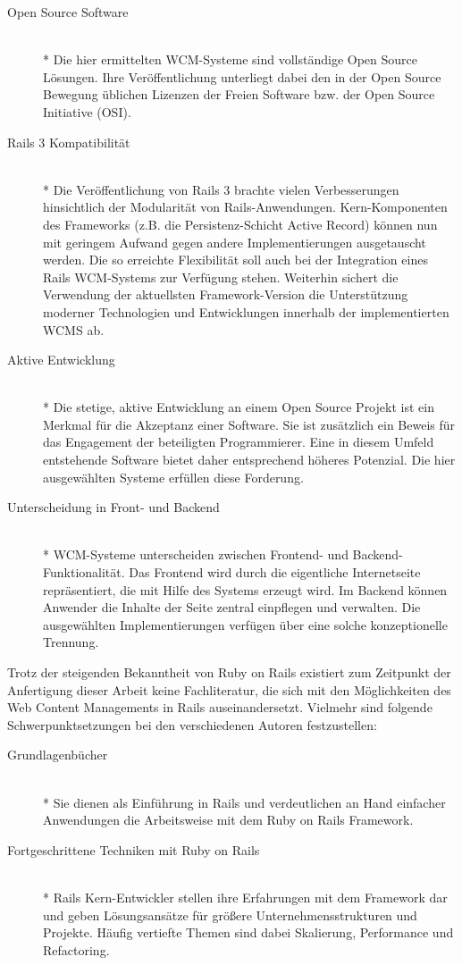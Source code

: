 \begin{description}
\item[Open Source Software]\mbox{~}\\*
Die hier ermittelten WCM-Systeme sind vollständige Open Source Lösungen. Ihre Veröffentlichung unterliegt dabei den in der Open Source Bewegung üblichen Lizenzen der Freien Software bzw. der Open Source Initiative (OSI).
\item[Rails 3 Kompatibilität]\mbox{~}\\*
Die Veröffentlichung von Rails 3 brachte vielen Verbesserungen hinsichtlich der Modularität von Rails-Anwendungen. Kern-Komponenten des Frameworks (z.B. die Persistenz-Schicht Active Record) können nun mit geringem Aufwand gegen andere Implementierungen ausgetauscht werden. Die so erreichte Flexibilität soll auch bei der Integration eines Rails WCM-Systems zur Verfügung stehen.	Weiterhin sichert die Verwendung der aktuellsten Framework-Version die 	Unterstützung moderner Technologien und Entwicklungen innerhalb der implementierten WCMS ab.
\item[Aktive Entwicklung]\mbox{~}\\*
Die stetige, aktive Entwicklung an einem Open Source Projekt ist ein Merkmal für die Akzeptanz einer Software. Sie ist zusätzlich ein Beweis für das Engagement der beteiligten Programmierer. Eine in diesem Umfeld entstehende Software bietet daher entsprechend höheres Potenzial. Die  hier ausgewählten Systeme erfüllen diese Forderung.
\item[Unterscheidung in Front- und Backend]\mbox{~}\\*
WCM-Systeme unterscheiden zwischen Frontend- und Backend-Funktionalität. Das Frontend wird durch die eigentliche Internetseite repräsentiert, die mit Hilfe des Systems erzeugt wird. Im Backend können Anwender die Inhalte der Seite zentral einpflegen und verwalten.
Die ausgewählten Implementierungen verfügen über eine solche konzeptionelle Trennung.
\end{description}

Trotz der steigenden Bekanntheit von Ruby on Rails existiert zum Zeitpunkt der Anfertigung dieser Arbeit keine Fachliteratur, die sich mit den Möglichkeiten des Web Content Managements in Rails auseinandersetzt. Vielmehr sind folgende Schwerpunktsetzungen bei den verschiedenen Autoren festzustellen:
\begin{description}
\item[Grundlagenbücher]\mbox{~}\\*
Sie dienen als Einführung in Rails und verdeutlichen an Hand einfacher Anwendungen die Arbeitsweise mit dem Ruby on Rails Framework.
\item[Fortgeschrittene Techniken mit Ruby on Rails]\mbox{~}\\*
Rails Kern-Entwickler stellen ihre Erfahrungen mit dem Framework dar und geben Lösungsansätze für größere Unternehmensstrukturen und Projekte. Häufig vertiefte Themen sind dabei Skalierung, Performance und Refactoring.
\end{description}

